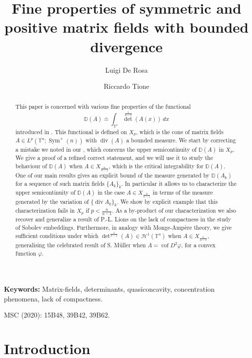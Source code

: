 \documentclass[10pt,reqno]{amsart}
\title{Fine properties of symmetric and positive matrix fields with bounded divergence}
\author{Luigi De Rosa}
\author{Riccardo Tione}
\numberwithin{equation}{section}
\newcommand{\T}{\mathbb{T}}
\newcommand{\D}{\mathbb{D}}
\DeclareMathOperator{\cof}{cof}
\DeclareMathOperator{\dv}{div}
\DeclareMathOperator{\Sym}{Sym}
\theoremstyle{plain}
\theoremstyle{definition}
\theoremstyle{remark}
\begin{document}
\begin{abstract}
This paper is concerned with various fine properties of the functional 
\[
\D(A) \doteq \int_{\T^n}{\det}^\frac{1}{n-1}(A(x))\,dx
\]
introduced in \cite{SER}. This functional is defined on $X_p$, which is the cone of matrix fields $A \in L^p(\T^n;\Sym^+(n))$ with $\dv(A)$ a bounded measure. We start by correcting a mistake we noted in our \cite[Corollary 7]{USC}, which concerns the upper semicontinuity of $\D(A)$ in $X_p$. We give a proof of a refined correct statement, and we will use it to study the behaviour of $\D(A)$ when $A \in X_\frac{n}{n-1}$, which is the critical integrability for $\D(A)$. One of our main results gives an explicit bound of the measure generated by $\D(A_k)$ for a sequence of such matrix fields $\{A_k\}_k$. In particular it allows us to characterize the upper semicontinuity of $\D(A)$ in the case $A \in X_\frac{n}{n - 1}$ in terms of the measure generated by the variation of $\{\dv A_k\}_k$.  We show by explicit  example that this characterization fails in $X_p$ if $p<\frac{n}{n-1}$.  As a by-product of our characterization we also recover and generalize a result of P.-L. Lions \cite{PLL3,PLL4} on the lack of compactness in the study of Sobolev embeddings. Furthermore, in analogy with Monge-Amp\`ere theory, we give sufficient conditions under which $\det^\frac{1}{n-1}(A) \in \mathcal{H}^1(\T^n)$ when $A \in X_\frac{n}{n - 1}$, generalising the celebrated result of S. M\"uller \cite{MULDETPOS} when $A=\cof D^2\varphi$, for a convex function $\varphi$.
\end{abstract}

\maketitle



\par
\medskip\noindent
\textbf{Keywords:} Matrix-fields, determinants, quasiconcavity, concentration phenomena, lack of compactness.
\par
\medskip\noindent
{\sc MSC (2020):  15B48, 39B42, 39B62.
\par
}

\par
\medskip\noindent


\section{Introduction}
\end{document}
